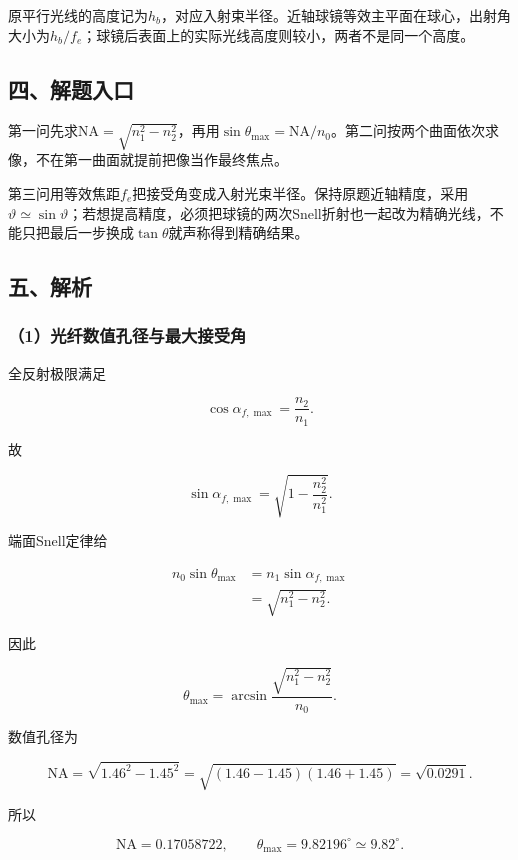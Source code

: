 \documentclass[12pt,a4paper,fontset=fandol]{ctexart}
\begin{document}
原平行光线的高度记为\(h_b\)，对应入射束半径。近轴球镜等效主平面在球心，出射角大小为\(h_b/f_e\)；球镜后表面上的实际光线高度则较小，两者不是同一个高度。

\subsection{四、解题入口}\label{ux56dbux89e3ux9898ux5165ux53e3-4}

第一问先求\(\mathrm{NA}=\sqrt{n_1^2-n_2^2}\)，再用\(\sin\theta_{\max}=\mathrm{NA}/n_0\)。第二问按两个曲面依次求像，不在第一曲面就提前把像当作最终焦点。

第三问用等效焦距\(f_e\)把接受角变成入射光束半径。保持原题近轴精度，采用\(\vartheta\simeq\sin\vartheta\)；若想提高精度，必须把球镜的两次Snell折射也一起改为精确光线，不能只把最后一步换成\(\tan\theta\)就声称得到精确结果。

\subsection{五、解析}\label{ux4e94ux89e3ux6790-4}

\subsubsection{（1）光纤数值孔径与最大接受角}\label{ux5149ux7ea4ux6570ux503cux5b54ux5f84ux4e0eux6700ux5927ux63a5ux53d7ux89d2}

全反射极限满足

\[
\cos\alpha_{f,\max}=\frac{n_2}{n_1}.
\]

故

\[
\sin\alpha_{f,\max}
=\sqrt{1-\frac{n_2^2}{n_1^2}}.
\]

端面Snell定律给

\[
\begin{aligned}
n_0\sin\theta_{\max}
&=n_1\sin\alpha_{f,\max}\\
&=\sqrt{n_1^2-n_2^2}.
\end{aligned}
\]

因此

\[
\boxed{\theta_{\max}
=\arcsin\frac{\sqrt{n_1^2-n_2^2}}{n_0}}.
\]

数值孔径为

\[
\mathrm{NA}
=\sqrt{1.46^2-1.45^2}
=\sqrt{(1.46-1.45)(1.46+1.45)}
=\sqrt{0.0291}.
\]

所以

\[
\mathrm{NA}=0.17058722,
\qquad
\boxed{\theta_{\max}=9.82196^\circ\simeq9.82^\circ}.
\]
\end{document}
